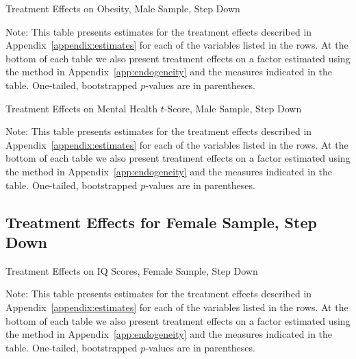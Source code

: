 	\begin{table}[H]
     \caption{Treatment Effects on Obesity, Male Sample, Step Down}
     \label{table:abccare_rslt_male_cat15_sd}
	
	\end{table} 
\begin{spacing}{1}
\begin{footnotesize}
\noindent Note: This table presents estimates for the treatment effects described in Appendix~\ref{appendix:estimates} for each of the variables listed in the rows. At the bottom of each table we also present treatment effects on a factor estimated using the method in Appendix~\ref{app:endogeneity} and the measures indicated in the table. One-tailed, bootstrapped $p$-values are in parentheses.
\end{footnotesize}
\end{spacing}

	\begin{table}[H]
     \caption{Treatment Effects on Mental Health $t$-Score, Male Sample, Step Down}
     \label{table:abccare_rslt_male_cat16_sd}
	
	\end{table} 
\begin{spacing}{1}
\begin{footnotesize}
\noindent Note: This table presents estimates for the treatment effects described in Appendix~\ref{appendix:estimates} for each of the variables listed in the rows. At the bottom of each table we also present treatment effects on a factor estimated using the method in Appendix~\ref{app:endogeneity} and the measures indicated in the table. One-tailed, bootstrapped $p$-values are in parentheses.
\end{footnotesize}
\end{spacing}






\subsection{Treatment Effects for Female Sample, Step Down}


	
	\begin{table}[H]
     \caption{Treatment Effects on IQ Scores, Female Sample, Step Down}
     \label{table:abccare_rslt_female_cat0_sd}
	
	\end{table}
\begin{spacing}{1}
\begin{footnotesize}
\noindent Note: This table presents estimates for the treatment effects described in Appendix~\ref{appendix:estimates} for each of the variables listed in the rows. At the bottom of each table we also present treatment effects on a factor estimated using the method in Appendix~\ref{app:endogeneity} and the measures indicated in the table. One-tailed, bootstrapped $p$-values are in parentheses.
\end{footnotesize}
\end{spacing}

